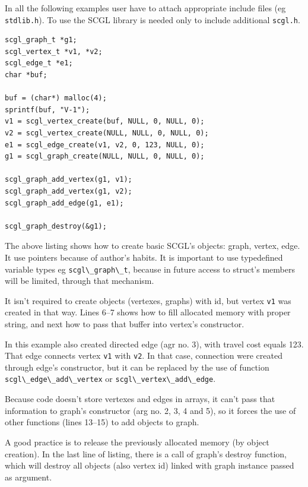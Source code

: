\documentclass[a4paper,12pt,polish,twoside,openright]{thesis}
\newcommand\code[1]{\lstinline[style=line]{#1}}
\begin{document}
In all the following examples user have to attach appropriate include files (eg \code{stdlib.h}).
To use the SCGL library is needed only to include additional \code{scgl.h}.
\begin{lstlisting}[style=code,caption={Creating a graph, vertexes and edges}]
scgl_graph_t *g1;
scgl_vertex_t *v1, *v2;
scgl_edge_t *e1;
char *buf;

buf = (char*) malloc(4);
sprintf(buf, "V-1");
v1 = scgl_vertex_create(buf, NULL, 0, NULL, 0);
v2 = scgl_vertex_create(NULL, NULL, 0, NULL, 0);
e1 = scgl_edge_create(v1, v2, 0, 123, NULL, 0);
g1 = scgl_graph_create(NULL, NULL, 0, NULL, 0);

scgl_graph_add_vertex(g1, v1);
scgl_graph_add_vertex(g1, v2);
scgl_graph_add_edge(g1, e1);

scgl_graph_destroy(&g1);
\end{lstlisting}
The above listing shows how to create basic SCGL's objects: graph, vertex, edge.
It use pointers because of author's habits.
It is important to use typedefined variable types eg \code{scgl\_graph\_t}, because in future access to struct's members will be limited, through that mechanism.

It isn't required to create objects (vertexes, graphs) with id, but vertex \code{v1} was created in that way.
Lines 6--7 shows how to fill allocated memory with proper string, and next how to pass that buffer into vertex's constructor.

In this example also created directed edge (agr no. 3), with travel cost equals 123.
That edge connects vertex \code{v1} with \code{v2}.
In that case, connection were created through edge's constructor, but it can be replaced by the use of function \code{scgl\_edge\_add\_vertex} or \code{scgl\_vertex\_add\_edge}.

Because code doesn't store vertexes and edges in arrays, it can't pass that information to graph's constructor (arg no. 2, 3, 4 and 5), so it forces the use of other functions (lines 13--15) to add objects to graph.

A good practice is to release the previously allocated memory (by object creation).
In the last line of listing, there is a call of graph's destroy function, which will destroy all objects (also vertex id) linked with graph instance passed as argument.
\end{document}
